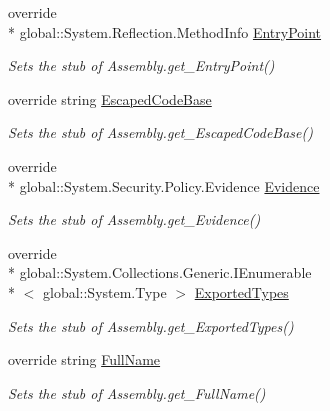 \begin{DoxyCompactItemize}
override \\*
global\-::\-System.\-Reflection.\-Method\-Info \hyperlink{class_system_1_1_reflection_1_1_fakes_1_1_stub_assembly_afb9af18cefba8a7ff76b793afa87cbc6}{Entry\-Point}
\begin{DoxyCompactList}\small\item\em Sets the stub of Assembly.\-get\-\_\-\-Entry\-Point()\end{DoxyCompactList}\item 
override string \hyperlink{class_system_1_1_reflection_1_1_fakes_1_1_stub_assembly_a8231ec969c5232f05bc308351ba9fe56}{Escaped\-Code\-Base}
\begin{DoxyCompactList}\small\item\em Sets the stub of Assembly.\-get\-\_\-\-Escaped\-Code\-Base()\end{DoxyCompactList}\item 
override \\*
global\-::\-System.\-Security.\-Policy.\-Evidence \hyperlink{class_system_1_1_reflection_1_1_fakes_1_1_stub_assembly_ad9e0d19f3c3a1728e70942f84ec9b4a8}{Evidence}
\begin{DoxyCompactList}\small\item\em Sets the stub of Assembly.\-get\-\_\-\-Evidence()\end{DoxyCompactList}\item 
override \\*
global\-::\-System.\-Collections.\-Generic.\-I\-Enumerable\\*
$<$ global\-::\-System.\-Type $>$ \hyperlink{class_system_1_1_reflection_1_1_fakes_1_1_stub_assembly_a4756fa318483379cbc25cc20633d6342}{Exported\-Types}
\begin{DoxyCompactList}\small\item\em Sets the stub of Assembly.\-get\-\_\-\-Exported\-Types()\end{DoxyCompactList}\item 
override string \hyperlink{class_system_1_1_reflection_1_1_fakes_1_1_stub_assembly_abbda4074099f00338cbf23d33d7e6a12}{Full\-Name}
\begin{DoxyCompactList}\small\item\em Sets the stub of Assembly.\-get\-\_\-\-Full\-Name()\end{DoxyCompactList}\item 

\end{DoxyCompactItemize}
